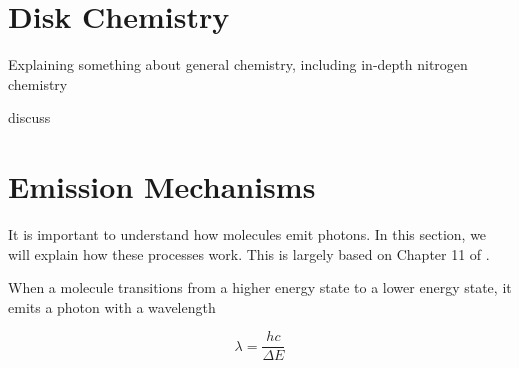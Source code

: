 \documentclass[twoside, single, authoryear, semicolon, 12pt]{lion-msc}
\newcommand{\4}{$_4$}
\newcommand{\3}{$_3$}
\newcommand{\2}{$_2$}
\begin{document}


\section{Disk Chemistry}
Explaining something about general chemistry, including in-depth nitrogen chemistry

discuss \cite{van_Gelder_2024}
\section{Emission Mechanisms}
It is important to understand how molecules emit photons. In this section, we will explain how these processes work. This is largely based on Chapter 11 of \cite{1979rpa..book.....R}. 

When a molecule transitions from a higher energy state to a lower energy state, it emits a photon with a wavelength

\begin{equation}
    \lambda=\frac{hc}{\Delta E}
\end{equation}
\end{document}
